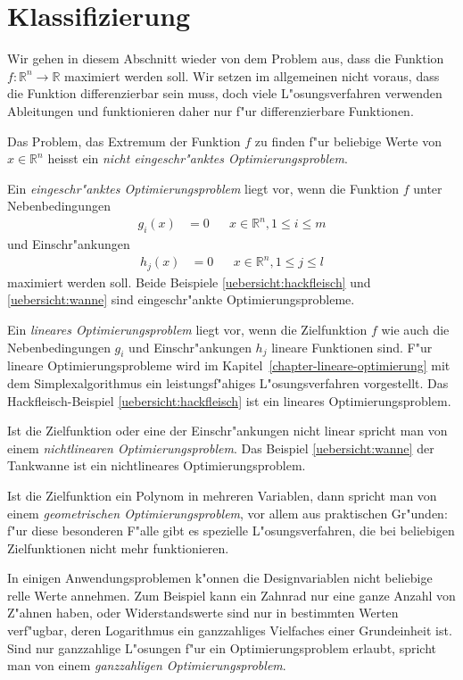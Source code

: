 \section{Klassifizierung \label{section-klassifizierung}}
Wir gehen in diesem Abschnitt wieder von dem Problem aus, dass die Funktion
$f\colon\mathbb R^n\to\mathbb R$ maximiert werden soll.
Wir setzen im allgemeinen nicht voraus, dass die Funktion differenzierbar
sein muss, doch viele L"osungsverfahren verwenden Ableitungen und 
funktionieren daher nur f"ur differenzierbare Funktionen.

Das Problem, das Extremum der Funktion $f$ zu finden f"ur beliebige
Werte von $x\in\mathbb R^n$ heisst ein {\em nicht eingeschr"anktes
Optimierungsproblem}.


Ein {\em eingeschr"anktes Optimierungsproblem} liegt vor, wenn die
Funktion $f$ unter
Nebenbedingungen 
\begin{align*}
g_i(x)&=0&&x\in\mathbb R^n, 1\le i\le m
\end{align*}
und Einschr"ankungen
\begin{align*}
h_j(x)&=0&&x\in\mathbb R^n, 1\le j\le l
\end{align*}
maximiert werden soll. Beide Beispiele \ref{uebersicht:hackfleisch}
und \ref{uebersicht:wanne} sind eingeschr"ankte Optimierungsprobleme.

Ein {\em lineares Optimierungsproblem} liegt vor, wenn die
Zielfunktion $f$ wie auch die Nebenbedingungen $g_i$ und
Einschr"ankungen $h_j$ lineare Funktionen sind.
F"ur lineare Optimierungsprobleme wird im
Kapitel~\ref{chapter-lineare-optimierung} mit dem Simplexalgorithmus
ein leistungsf"ahiges L"osungsverfahren vorgestellt.
Das Hackfleisch-Beispiel \ref{uebersicht:hackfleisch} ist ein lineares
Optimierungsproblem.

Ist die Zielfunktion oder eine der Einschr"ankungen nicht linear
spricht man von einem {\em nichtlinearen Optimierungsproblem}.
Das Beispiel \ref{uebersicht:wanne} der Tankwanne ist ein nichtlineares
Optimierungsproblem.

Ist die Zielfunktion ein Polynom in mehreren Variablen, dann spricht
man von einem {\em geometrischen Optimierungsproblem}, vor allem
aus praktischen Gr"unden: f"ur diese besonderen F"alle gibt es 
spezielle L"osungsverfahren, die bei beliebigen Zielfunktionen
nicht mehr funktionieren.

In einigen Anwendungsproblemen k"onnen die Designvariablen nicht beliebige
relle Werte annehmen. Zum Beispiel kann ein Zahnrad nur eine ganze Anzahl
von Z"ahnen haben, oder Widerstandswerte sind nur in bestimmten Werten
verf"ugbar, deren Logarithmus ein ganzzahliges Vielfaches einer
Grundeinheit ist. Sind nur ganzzahlige L"osungen f"ur ein Optimierungsproblem
erlaubt, spricht man von einem {\em ganzzahligen Optimierungsproblem}.

